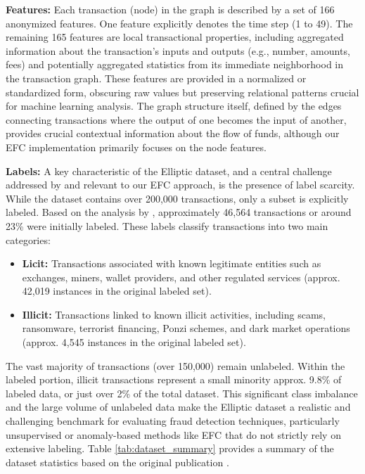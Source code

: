 \documentclass[12pt]{article}
\begin{document}
\textbf{Features:} Each transaction (node) in the graph is described by a set of 166 anonymized features. One feature
explicitly denotes the time step (1 to 49). The remaining 165 features are local transactional properties, including
aggregated information about the transaction's inputs and outputs (e.g., number, amounts, fees) and potentially aggregated
statistics from its immediate neighborhood in the transaction graph. These features are provided in a normalized or
standardized form, obscuring raw values but preserving relational patterns crucial for machine learning analysis. The
graph structure itself, defined by the edges connecting transactions where the output of one becomes the input of another,
provides crucial contextual information about the flow of funds, although our EFC implementation primarily focuses on the
node features.

\textbf{Labels:} A key characteristic of the Elliptic dataset, and a central challenge addressed by 
\cite{lorenz2021machinelearningmethodsdetect} and relevant to our EFC approach, is the presence of label scarcity. While
the dataset contains over 200,000 transactions, only a subset is explicitly labeled. Based on the analysis by 
\cite{weber2019antimoneylaunderingbitcoinexperimenting}, approximately 46,564 transactions or around 23\% were initially labeled.
These labels classify transactions into two main categories:

\begin{itemize}
    \item \textbf{Licit:} Transactions associated with known legitimate entities such as exchanges, miners, wallet providers,
      and other regulated services (approx. 42,019 instances in the original labeled set).
    \item \textbf{Illicit:} Transactions linked to known illicit activities, including scams, ransomware, terrorist financing,
      Ponzi schemes, and dark market operations (approx. 4,545 instances in the original labeled set).
\end{itemize}

The vast majority of transactions (over 150,000) remain unlabeled. Within the labeled portion, illicit transactions represent
a small minority approx. 9.8\% of labeled data, or just over 2\% of the total dataset. This significant class imbalance
and the large volume of unlabeled data make the Elliptic dataset a realistic and challenging benchmark for evaluating fraud
detection techniques, particularly unsupervised or anomaly-based methods like EFC that do not strictly rely on extensive
labeling. Table \ref{tab:dataset_summary} provides a summary of the dataset statistics based on the original publication
\cite{weber2019antimoneylaunderingbitcoinexperimenting}.
\end{document}

